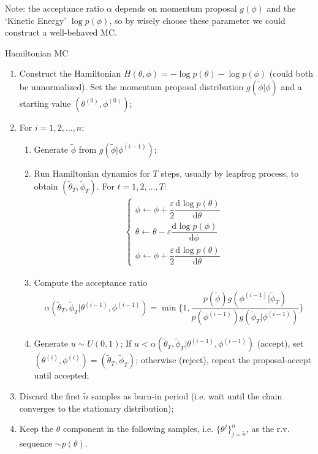 Note: the acceptance ratio $ \alpha  $ depends on momentum proposal $ g(\phi ) $ and the `Kinetic Energy' $ \log p(\phi ) $, so by wisely choose these parameter we could construct a well-behaved MC.


\begin{algorithm}{Hamiltonian MC}
    \begin{enumerate}[topsep=2pt,itemsep=0pt]
        \item Construct the Hamiltonian $ H(\theta ,\phi )=-\log p(\theta )-\log p(\phi ) $ (could both be unnormalized). Set the momentum proposal distribution $ g(\tilde{\phi  }|\phi   ) $ and a starting value $ (\theta ^{(0)},\phi ^{(0)}) $;
        \item For $ i=1,2,\ldots,n $:
        \begin{enumerate}[topsep=2pt,itemsep=2pt]
            \item Generate $ \tilde{\phi  } $ from $ g(\tilde{\phi  }|\phi  ^{(i-1)} ) $;
            \item Run Hamiltonian dynamics for $ T $ steps, usually by leapfrog process, to obtain $ (\tilde{\theta }_T,\tilde{\phi }_T) $. For $ t=1,2,\ldots,T $:
            \begin{align}
                \begin{cases}
                    \phi \leftarrow \phi + \dfrac{ \varepsilon  }{ 2 }\dfrac{\mathrm{d}^{} \log p(\theta ) }{\mathrm{d} \theta ^{} }\\
                    \theta \leftarrow \theta - \varepsilon \dfrac{ \mathrm{d}^{} \log p(\phi ) }{\mathrm{d} \phi ^{} }\\
                    \phi \leftarrow \phi + \dfrac{ \varepsilon  }{ 2 }\dfrac{\mathrm{d}^{} \log p(\theta ) }{\mathrm{d} \theta ^{} }
                \end{cases}
            \end{align}
            \item Compute the acceptance ratio
            \begin{align}
                \alpha (\tilde{\theta }_T,\tilde{\phi }_T|\theta ^{(i-1)},\phi ^{(i-1)} )=\min\bigg\{ 1,\dfrac{p(\tilde{\phi })g(\phi ^{(i-1)}|\tilde{\phi }_T) }{ p(\phi ^{(i-1)})g(\tilde{\phi }_T|\phi ^{(i-1)}) }   \bigg\}
            \end{align}
            \item Generate $ u\sim U(0,1) $; If $ u<\alpha (\tilde{\theta }_T,\tilde{\phi }_T|\theta ^{(i-1)},\phi ^{(i-1)} )$ (accept), set $ (\theta ^{(i)},\phi ^{(i)})=(\tilde{\theta }_T,\tilde{\phi }_T) $; otherwise (reject), repeat the proposal-accept
            until accepted;
        \end{enumerate}
        \item Discard the first $ \tilde{n} $ samples as burn-in period (i.e. wait until the chain converges to the stationary distribution);
        \item Keep the $ \theta  $ component in the following samples, i.e. $ \{\theta ^{j}\}_{j=\tilde{n}}^n $, as the r.v. sequence $ \sim p(\theta ) $.
    \end{enumerate}
\end{algorithm}

